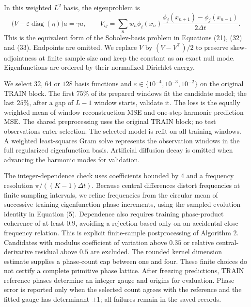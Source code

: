 \documentclass[11pt,a4paper]{article}
\begin{document}
In this weighted $L^2$ basis, the eigenproblem is
\[
\bigl(V-\varepsilon\operatorname{diag}(\eta)\bigr)a=\gamma a,
\qquad
V_{ij}=\sum_n w_n\phi_i(x_n)
\frac{\phi_j(x_{n+1})-\phi_j(x_{n-1})}{2\Delta t}.
\]
This is the equivalent form of the Sobolev-basis problem in Equations
(21), (32) and (33). Endpoints are omitted. We replace $V$ by
$(V-V^\top)/2$ to preserve skew-adjointness at finite sample size and keep
the constant as an exact null mode. Eigenfunctions are ordered by their
normalized Dirichlet energy.

We select $32$, $64$ or $128$ basis functions and
$\varepsilon\in\{10^{-4},10^{-3},10^{-2}\}$ on the original TRAIN block.
The first $75\%$ of its prepared windows fit the candidate model; the last
$25\%$, after a gap of $L-1$ window starts, validate it. The loss is the
equally weighted mean of window reconstruction MSE and one-step harmonic
prediction MSE. The shared preprocessing uses the original TRAIN block;
no test observations enter selection. The selected model is refit on all
training windows. A weighted least-squares Gram solve represents the
observation windows in the full regularized eigenfunction basis. Artificial
diffusion decay is omitted when advancing the harmonic modes for validation.

The integer-dependence check uses coefficients bounded by $4$ and a
frequency resolution $\pi/((K-1)\Delta t)$. Because central differences
distort frequencies at finite sampling intervals, we refine frequencies
from the circular mean of successive training eigenfunction phase
increments, using the sampled evolution identity in Equation (5).
Dependence also requires training phase-product coherence of at least
$0.9$, avoiding a rejection based only on an accidental close frequency
relation. This is explicit finite-sample postprocessing of Algorithm 2.
Candidates with modulus coefficient of variation above $0.35$ or relative
central-derivative residual above $0.5$ are excluded. The rounded kernel
dimension estimate supplies a phase-count cap between one and four.
These finite choices do not certify a complete primitive phase lattice.
After freezing predictions, TRAIN reference phases determine an integer
gauge and origins for evaluation. Phase error is reported only when the
selected count agrees with the reference and the fitted gauge has
determinant $\pm1$; all failures remain in the saved records.
\end{document}
